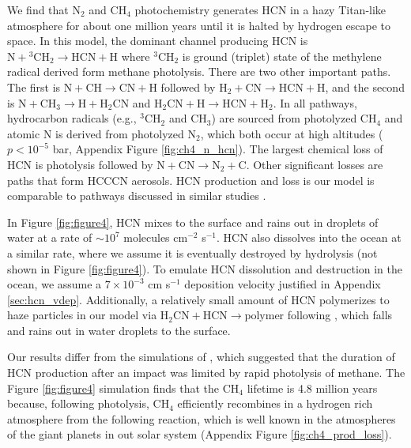We find that N$_2$ and CH$_4$ photochemistry generates HCN in a hazy Titan-like atmosphere for about one million years until it is halted by hydrogen escape to space. In this model, the dominant channel producing HCN is $\mathrm{N} + \mathrm{^3CH_2} \rightarrow \mathrm{HCN} + \mathrm{H}$ where $\mathrm{^3CH_2}$ is ground (triplet) state of the methylene radical derived form methane photolysis. There are two other important paths. The first is $\mathrm{N} + \mathrm{CH} \rightarrow \mathrm{CN} + \mathrm{H}$ followed by $\mathrm{H_2} + \mathrm{CN} \rightarrow \mathrm{HCN} + \mathrm{H}$, and the second is $\mathrm{N} + \mathrm{CH_3} \rightarrow \mathrm{H} + \mathrm{H_2CN}$ and $\mathrm{H_2CN} + \mathrm{H} \rightarrow \mathrm{HCN} + \mathrm{H_2}$. In all pathways, hydrocarbon radicals (e.g., $\mathrm{^3CH_2}$ and $\mathrm{CH_3}$) are sourced from photolyzed CH$_4$ and atomic N is derived from photolyzed N$_2$, which both occur at high altitudes ($p < 10^{-5}$ bar, Appendix Figure \ref{fig:ch4_n_hcn}). The largest chemical loss of HCN is photolysis followed by $\mathrm{N} + \mathrm{CN} \rightarrow \mathrm{N_2} + \mathrm{C}$. Other significant losses are paths that form HCCCN aerosols. HCN production and loss is our model is comparable to pathways discussed in similar studies \citep{Zahnle_1986,Tian_2011,Rimmer_2019}.

In Figure \ref{fig:figure4}, HCN mixes to the surface and rains out in droplets of water at a rate of $\sim 10^7$ molecules cm$^{-2}$ s$^{-1}$. HCN also dissolves into the ocean at a similar rate, where we assume it is eventually destroyed by hydrolysis (not shown in Figure \ref{fig:figure4}). To emulate HCN dissolution and destruction in the ocean, we assume a $7 \times 10^{-3}$ cm s$^{-1}$ deposition velocity justified in Appendix \ref{sec:hcn_vdep}. Additionally, a relatively small amount of HCN polymerizes to haze particles in our model via $\mathrm{H_2CN} + \mathrm{HCN} \rightarrow \mathrm{polymer}$ following \citet{Lavvas_2008}, which falls and rains out in water droplets to the surface.

Our results differ from the simulations of \citet{Zahnle_2020}, which suggested that the duration of HCN production after an impact was limited by rapid photolysis of methane. The Figure \ref{fig:figure4} simulation finds that the CH$_4$ lifetime is 4.8 million years because, following photolysis, CH$_4$ efficiently recombines in a hydrogen rich atmosphere from the following reaction, which is well known in the atmospheres of the giant planets in out solar system (Appendix Figure \ref{fig:ch4_prod_loss}).

